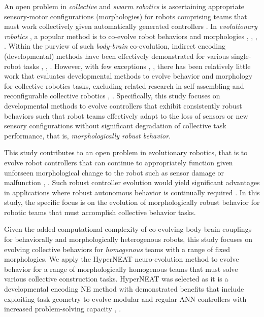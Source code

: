 \documentclass[conference]{IEEEtran}
\begin{document}
An open problem in \textit{collective} \cite{KubeZhang1994B} and \textit{swarm robotics} \cite{Beni2004}
is ascertaining appropriate sensory-motor configurations
(morphologies) for robots comprising teams that must work
collectively given automatically generated controllers \cite{FloreanoDurrMattiussi2008}.
In \textit{evolutionary robotics} \cite{DoncieuxBredecheMouretEiben2015},
a popular method is to co-evolve robot behaviors and morphologies
\cite{LipsonPollack2000}, \cite{Lund2003}, \cite{BuasonBergfeldtZiemke2005}, \cite{AuerbachBongard2014}.
Within the purview of such \textit{body-brain} co-evolution, indirect encoding (developmental) methods
have been effectively demonstrated for various single-robot tasks \cite{MautnerBelew2000},
\cite{HornbyPollack2002}, \cite{CheneyLipson2013}.
However, with few exceptions \cite{AsaiArita2003}, \cite{WatsonNitschke2015SSCI}, \cite{HewlandNitschke2015}
there has been relatively little work that evaluates developmental methods to evolve behavior and morphology
for collective robotics tasks, excluding related research in self-assembling and
reconfigurable collective robotics \cite{OGradyDorigo2012}, \cite{RubensteinCornejoNagpal2014}.
Specifically, this study focuses on developmental methods to evolve controllers that exhibit consistently
robust behaviors such that robot teams effectively adapt to the loss of sensors or new sensory configurations
without significant degradation of collective task performance, that is, \textit{morphologically robust behavior}.

This study contributes to an open problem in evolutionary robotics, that is to evolve
robot controllers that can continue to appropriately function given unforseen morphological change
to the robot such as sensor damage or malfunction \cite{BongardZykovLipson2006},
\cite{CullyCluneTaraporeMouret2015}.  Such robust controller evolution would yield significant advantages
in applications where robust autonomous behavior is continually required \cite{BrooksFlynn1989}.
In this study, the specific focus is on the evolution of morphologically robust behavior
for robotic teams that must accomplish collective behavior tasks.

Given the added computational complexity of co-evolving body-brain couplings
for behaviorally and morphologically heterogenous robots,
this study focuses on evolving collective behaviors for \textit{homogenous} teams with a range of fixed morphologies.
We apply the HyperNEAT \cite{StanleyDAmbrosioGauci2009} neuro-evolution method to evolve
behavior for a range of morphologically homogenous teams that must solve various collective construction tasks.
HyperNEAT was selected as it is a developmental encoding NE method with demonstrated benefits
that include exploiting task geometry to evolve modular and regular ANN controllers with
increased problem-solving capacity \cite{VerbancsicsStanley2011}, \cite{DAmbrosio2013}.
\end{document}
